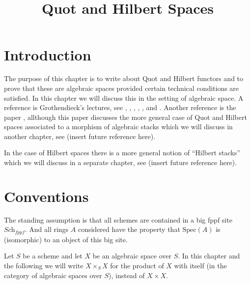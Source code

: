 

%


\title{Quot and Hilbert Spaces}

\maketitle

\label{section-phantom}

\tableofcontents




\section{Introduction}
\label{section-introduction}

\noindent
The purpose of this chapter is to write about Quot and Hilbert functors
and to prove that these are algebraic spaces provided certain technical
conditions are satisfied. In this chapter we will discuss this in the
setting of algebraic space. A reference is Grothendieck's lectures, see
\cite{Gr-I},
\cite{Gr-II},
\cite{Gr-III},
\cite{Gr-IV},
\cite{Gr-V}, and
\cite{Gr-VI}.
Another reference is the paper \cite{OS}, allthough this paper discusses
the more general case of Quot and Hilbert spaces associated to a morphism
of algebraic stacks which we will discuss in another chapter, see
(insert future reference here).

\medskip\noindent
In the case of Hilbert spaces there is a more general notion of
``Hilbert stacks'' which we will discuss in a separate chapter, see
(insert future reference here).



\section{Conventions}
\label{section-conventions}

\noindent
The standing assumption is that all schemes are contained in
a big fppf site $\textit{Sch}_{fppf}$. And all rings $A$ considered
have the property that $\text{Spec}(A)$ is (isomorphic) to an
object of this big site.

\medskip\noindent
Let $S$ be a scheme and let $X$ be an algebraic space over $S$.
In this chapter and the following we will write $X \times_S X$
for the product of $X$ with itself (in the category of algebraic
spaces over $S$), instead of $X \times X$.



